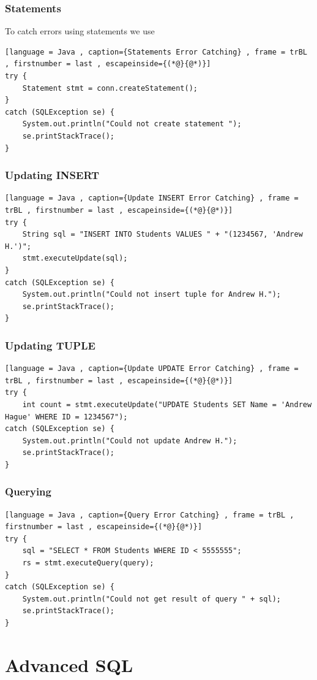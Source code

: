 \documentclass[a4paper]{article}
\theoremstyle{plain}
\theoremstyle{definition}
\theoremstyle{remark}
\begin{document}
\subsubsection{Statements}
To catch errors using statements we use
\begin{lstlisting}[language = Java , caption={Statements Error Catching} , frame = trBL , firstnumber = last , escapeinside={(*@}{@*)}]
try {
	Statement stmt = conn.createStatement();
}
catch (SQLException se) {
	System.out.println("Could not create statement ");
	se.printStackTrace();
}
\end{lstlisting}
\subsubsection{Updating INSERT}
\begin{lstlisting}[language = Java , caption={Update INSERT Error Catching} , frame = trBL , firstnumber = last , escapeinside={(*@}{@*)}]
try {
	String sql = "INSERT INTO Students VALUES " + "(1234567, 'Andrew H.')";
	stmt.executeUpdate(sql);
}
catch (SQLException se) {
	System.out.println("Could not insert tuple for Andrew H.");
	se.printStackTrace();
}
\end{lstlisting}
\subsubsection{Updating TUPLE}
\begin{lstlisting}[language = Java , caption={Update UPDATE Error Catching} , frame = trBL , firstnumber = last , escapeinside={(*@}{@*)}]
try {
	int count = stmt.executeUpdate("UPDATE Students SET Name = 'Andrew Hague' WHERE ID = 1234567");
catch (SQLException se) {
	System.out.println("Could not update Andrew H.");
	se.printStackTrace();
}
\end{lstlisting}
\subsubsection{Querying}
\begin{lstlisting}[language = Java , caption={Query Error Catching} , frame = trBL , firstnumber = last , escapeinside={(*@}{@*)}]
try {
	sql = "SELECT * FROM Students WHERE ID < 5555555";
	rs = stmt.executeQuery(query);
}
catch (SQLException se) {
	System.out.println("Could not get result of query " + sql);
	se.printStackTrace();
}
\end{lstlisting}
\section{Advanced SQL}
\end{document}
